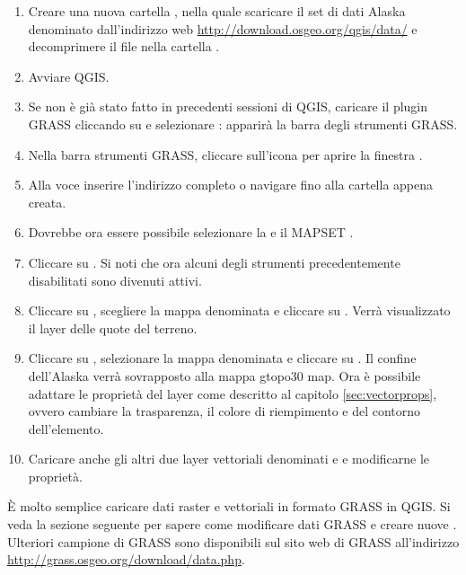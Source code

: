 \begin{enumerate}
  \item Creare una nuova cartella , nella quale scaricare
  il set di dati Alaska denominato 
  dall'indirizzo web \url{http://download.osgeo.org/qgis/data/} e decomprimere
  il file nella cartella .
  \item Avviare QGIS.
  \item Se non è già stato fatto in precedenti sessioni di QGIS, caricare il
  plugin GRASS cliccando su  \arrow {} e selezionare : apparirà la barra degli strumenti GRASS.
  \item Nella barra strumenti GRASS, cliccare sull'icona
   per aprire la finestra .
  \item Alla voce  inserire l'indirizzo completo o navigare
  fino alla cartella  appena creata.
  \item Dovrebbe ora essere possibile selezionare la  e il MAPSET . 
  \item Cliccare su . Si noti che ora alcuni degli strumenti
  precedentemente disabilitati sono divenuti attivi.
  \item Cliccare su ,
  scegliere la mappa denominata  e cliccare su .
  Verrà visualizzato il layer delle quote del terreno.
  \item Cliccare su ,
  selezionare la mappa denominata  e cliccare su .
  Il confine dell'Alaska verrà sovrapposto alla mappa gtopo30 map. Ora è
  possibile adattare le proprietà del layer come descritto al capitolo
  \ref{sec:vectorprops}, ovvero cambiare la trasparenza, il colore di
  riempimento e del contorno dell'elemento.
  \item Caricare anche gli altri due layer vettoriali denominati
   e  e modificarne le proprietà.
\end{enumerate}

È molto semplice caricare dati raster e vettoriali in
formato GRASS in QGIS. Si veda la sezione seguente per sapere come modificare
dati GRASS e creare nuove . Ulteriori 
campione di GRASS sono disponibili sul sito web di GRASS all'indirizzo
\url{http://grass.osgeo.org/download/data.php}.

